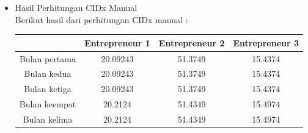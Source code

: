 \begin{itemize}
\item Hasil Perhitungan CIDx Manual\\
Berikut hasil dari perhitungan CIDx manual :
	\begin{table}[H]
	\centering
	\begin{tabular}{|c|c|c|c|}
	\hline
	& Entrepreneur 1 & Entrepreneur 2 & Entrepreneur 3\\
	\hline
	Bulan pertama & 20.09243 & 51.3749 & 15.4374\\
	\hline
	Bulan kedua & 20.09243 & 51.3749 & 15.4374\\
	\hline
	Bulan ketiga & 20.09243 & 51.3749 & 15.4374\\
	\hline
	Bulan keempat & 20.2124 & 51.4349 & 15.4974\\
	\hline
	Bulan kelima & 20.2124 & 51.4349 & 15.4974\\
	\hline
	\end{tabular}
	\end{table}
\end{itemize}

